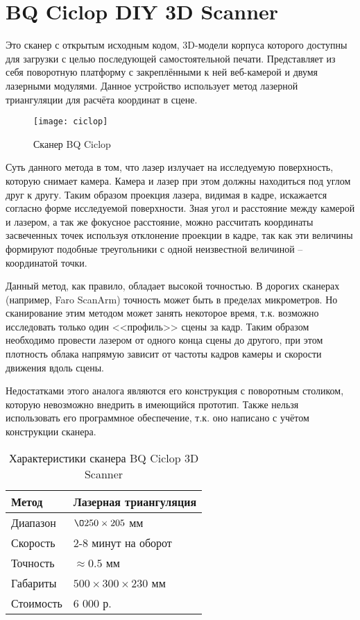     \section{BQ Ciclop DIY 3D Scanner}
        Это сканер с открытым исходным кодом, 3D-модели корпуса которого доступны для загрузки с целью последующей самостоятельной печати\cite{ciclop}. Представляет из себя поворотную платформу с закреплёнными к ней веб-камерой и двумя лазерными модулями. Данное устройство использует метод лазерной триангуляции для расчёта координат в сцене.

        \begin{figure}[H]
            \centering
            \texttt{[image: ciclop]}\label{pic:ciclop}
            \caption{Сканер BQ Ciclop}
        \end{figure}

        Суть данного метода в том, что лазер излучает на исследуемую поверхность, которую снимает камера. Камера и лазер при этом должны находиться под углом друг к другу. Таким образом проекция лазера, видимая в кадре, искажается согласно форме исследуемой поверхности. Зная угол и расстояние между камерой и лазером, а так же фокусное расстояние, можно рассчитать координаты засвеченных точек используя отклонение проекции в кадре, так как эти величины формируют подобные треугольники с одной неизвестной величиной -- координатой точки.

        Данный метод, как правило, обладает высокой точностью. В дорогих сканерах (например, Faro ScanArm) точность может быть в пределах микрометров. Но сканирование этим методом может занять некоторое время, т.к. возможно исследовать только один <<профиль>> сцены за кадр. Таким образом необходимо провести лазером от одного конца сцены до другого, при этом плотность облака напрямую зависит от частоты кадров камеры и скорости движения вдоль сцены.

        Недостатками этого аналога являются его конструкция с поворотным столиком, которую невозможно внедрить в имеющийся прототип. Также нельзя использовать его программное обеспечение, т.к. оно написано с учётом конструкции сканера.

        \begin{table}[H]
            \centering
            \caption{Характеристики сканера BQ Ciclop 3D Scanner}\label{table:ciclop}
            \begin{tabular}{|l|l|}\hline
            Метод&Лазерная триангуляция\\ \hline
            Диапазон&$\O250 \times 205$ мм\\ \hline
            Скорость&2-8 минут на оборот\\ \hline
            Точность&$\approx 0.5$ мм\\ \hline
            Габариты&$ 500 \times 300 \times 230 $ мм\\ \hline
            Стоимость&6 000 р.\\ \hline
            \end{tabular}
        \end{table}

